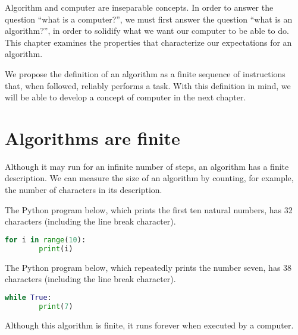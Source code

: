 
Algorithm and computer are inseparable concepts.
In order to answer the question ``what is a computer?'', we must first answer the question ``what is an algorithm?'', in order to solidify what we want our computer to be able to do.
This chapter examines the properties that characterize our expectations for an algorithm.

We propose the definition of an algorithm as a finite sequence of instructions that, when followed, reliably performs a task.
With this definition in mind, we will be able to develop a concept of computer in the next chapter.

\section{Algorithms are finite}

Although it may run for an infinite number of steps, an algorithm has a finite description.
We can measure the size of an algorithm by counting, for example, the number of characters in its description.

\begin{example}
  The Python program below, which prints the first ten natural numbers, has 32 characters (including the line break character).
  \begin{lstlisting}[language=Python]
    for i in range(10):
        print(i)
  \end{lstlisting}
\end{example}

\begin{example}
  The Python program below, which repeatedly prints the number seven, has 38 characters (including the line break character).
  \begin{lstlisting}[language=Python]
    while True:
        print(7)
  \end{lstlisting}
  Although this algorithm is finite, it runs forever when executed by a computer.
\end{example}

